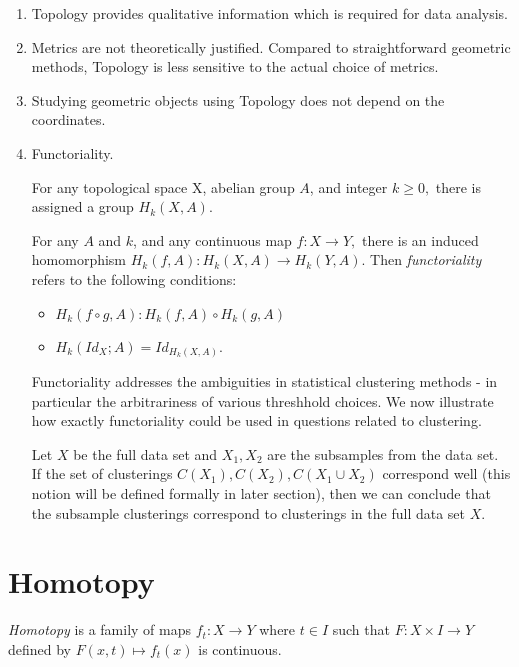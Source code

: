 \documentclass[11pt,reqno,oneside,a4paper]{article}
\begin{document}
\begin{enumerate}
	\item Topology provides qualitative information which is required for data analysis.
	
	\item Metrics are not theoretically justified. Compared to straightforward geometric methods, Topology is less sensitive to the actual choice of metrics. 
	
	\item Studying geometric objects using Topology does not depend on the coordinates. 
	
	\item Functoriality. 
	
	\begin{defn}
		For any topological space X, abelian group $A$, and integer $k\geq 0,$ there is assigned a group $H_k(X,A).$
		
		For any $A$ and $k$, and any continuous map $f: X \to Y,$ there is an induced homomorphism $H_k(f,A): H_k(X,A) \to H_k(Y,A).$ Then \textit{functoriality} refers to the following conditions:
		
		\begin{itemize}
			\item  $H_k(f\circ g,A): H_k(f,A) \circ H_k(g,A)$
			\item  $H_k(Id_{X};A) = Id_{H_k(X,A)}.$
		\end{itemize}
	\end{defn}

	Functoriality addresses the ambiguities in statistical clustering methods - in particular the arbitrariness of various threshhold choices. We now illustrate how exactly functoriality could be used in questions related to clustering. 
	
	Let $X$ be the full data set and $X_1,X_2$ are the subsamples from the data set. If the set of clusterings $C(X_1), C(X_2), C(X_1 \cup X_2)$ correspond well (this notion will be defined formally in later section), then we can conclude that the subsample clusterings correspond to clusterings in the full data set $X$. 
\end{enumerate}

\section{Homotopy} \label{sec:homotopy}

\begin{defn}
	\textit{Homotopy} is a family of maps $f_t: X \to Y$ where $t \in I$ such that $F: X\times I \to Y$ defined by $F(x,t) \mapsto f_t(x)$ is continuous.
\end{defn}
\end{document}
